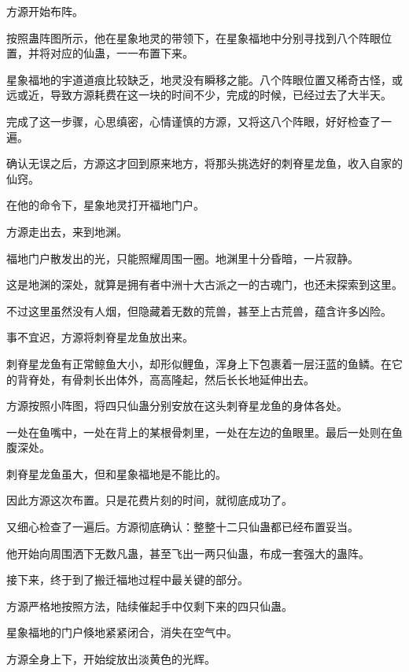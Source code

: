 
\begin{this_body}



方源开始布阵。

按照蛊阵图所示，他在星象地灵的带领下，在星象福地中分别寻找到八个阵眼位置，并将对应的仙蛊，一一布置下来。

星象福地的宇道道痕比较缺乏，地灵没有瞬移之能。八个阵眼位置又稀奇古怪，或远或近，导致方源耗费在这一块的时间不少，完成的时候，已经过去了大半天。

完成了这一步骤，心思缜密，心情谨慎的方源，又将这八个阵眼，好好检查了一遍。

确认无误之后，方源这才回到原来地方，将那头挑选好的刺脊星龙鱼，收入自家的仙窍。

在他的命令下，星象地灵打开福地门户。

方源走出去，来到地渊。

福地门户散发出的光，只能照耀周围一圈。地渊里十分昏暗，一片寂静。

这是地渊的深处，就算是拥有者中洲十大古派之一的古魂门，也还未探索到这里。

不过这里虽然没有人烟，但隐藏着无数的荒兽，甚至上古荒兽，蕴含许多凶险。

事不宜迟，方源将刺脊星龙鱼放出来。

刺脊星龙鱼有正常鲸鱼大小，却形似鲤鱼，浑身上下包裹着一层汪蓝的鱼鳞。在它的背脊处，有骨刺长出体外，高高隆起，然后长长地延伸出去。

方源按照小阵图，将四只仙蛊分别安放在这头刺脊星龙鱼的身体各处。

一处在鱼嘴中，一处在背上的某根骨刺里，一处在左边的鱼眼里。最后一处则在鱼腹深处。

刺脊星龙鱼虽大，但和星象福地是不能比的。

因此方源这次布置。只是花费片刻的时间，就彻底成功了。

又细心检查了一遍后。方源彻底确认：整整十二只仙蛊都已经布置妥当。

他开始向周围洒下无数凡蛊，甚至飞出一两只仙蛊，布成一套强大的蛊阵。

接下来，终于到了搬迁福地过程中最关键的部分。

方源严格地按照方法，陆续催起手中仅剩下来的四只仙蛊。

星象福地的门户倏地紧紧闭合，消失在空气中。

方源全身上下，开始绽放出淡黄色的光辉。


\end{this_body}
